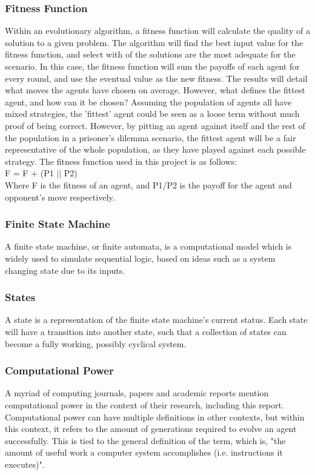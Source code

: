 \documentclass[12pt,a4paper]{article}
\begin{document}
\subsubsection{Fitness Function}
Within an evolutionary algorithm, a fitness function will calculate the quality of a solution to a given problem. The algorithm will find the best input value for the fitness function, and select with of the solutions are the most adequate for the scenario. In this case, the fitness function will sum the payoffs of each agent for every round, and use the eventual value as the new fitness. The results will detail what moves the agents have chosen on average. However, what defines the fittest agent, and how can it be chosen? Assuming the population of agents all have mixed strategies, the 'fittest' agent could be seen as a loose term without much proof of being correct. However, by pitting an agent against itself and the rest of the population in a prisoner's dilemma scenario, the fittest agent will be a fair representative of the whole population, as they have played against each possible strategy. The fitness function used in this project is as follows: \\

F = F + (P1 $||$  P2) \\

Where F is the fitness of an agent, and P1/P2 is the payoff for the agent and opponent's move respectively.

\subsubsection{Finite State Machine}
A finite state machine, or finite automata, is a computational model which is widely used to simulate sequential logic, based on ideas such as a system changing state due to its inputs.

\subsubsection{States}
A state is a representation of the finite state machine's current status. Each state will have a transition into another state, such that a collection of states can become a fully working, possibly cyclical system.

\subsubsection{Computational Power}
A myriad of computing journals, papers and academic reports mention computational power in the context of their research, including this report. Computational power can have multiple definitions in other contexts, but within this context, it refers to the amount of generations required to evolve an agent successfully. This is tied to the general definition of the term, which is, "the amount of useful work a computer system accomplishes (i.e. instructions it executes)".
\end{document}
